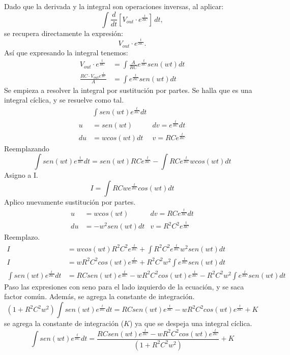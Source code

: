 \documentclass{article}
\begin{document}
Dado que la derivada y la integral son operaciones inversas, al aplicar:
\begin{equation*}
    \int \frac{d}{dt}\left[V_{out} \cdot e^{\frac{t}{RC}}\right]\,dt,
\end{equation*}
se recupera directamente la expresión:
\begin{equation*}
    V_{out} \cdot e^{\frac{t}{RC}}.
\end{equation*}
Así que expresando la integral tenemos:
\begin{align*}
    V_{out}\cdot e^{\frac{t}{RC}}&=\int \frac{A}{RC}e^{\frac{t}{RC}}sen(wt)dt \\
    \frac{RC\cdot V_{out}e^{\frac{t}{RC}}}{A}&=\int e^{\frac{t}{RC}}sen(wt)dt
\end{align*}
Se empieza a resolver la integral por sustitución por partes. Se halla que es una integral cíclica, y se resuelve como tal.
\begin{align*}
    &\int sen(wt)e^{\frac{t}{RC}}dt \\
    u&=sen(wt)
    &dv=e^{\frac{t}{RC}}dt\\
    du&=wcos(wt)dt
    &v=RCe^{\frac{t}{RC}}
\end{align*}
Reemplazando
\[
    \int sen(wt)e^{\frac{t}{RC}}dt=sen(wt)RCe^{\frac{t}{RC}}-\int RCe^{\frac{t}{RC}}wcos(wt)dt
\]
Asigno a I.
\[
    I=\int RCwe^{\frac{t}{RC}}cos(wt)dt
\]
Aplico nuevamente sustitución por partes.
\begin{align*}
    u&=wcos(wt)
    &dv=RCe^{\frac{t}{RC}}dt\\
    du&=-w^2sen(wt)dt
    &v=R^2C^2e^{\frac{t}{RC}}
\end{align*}
Reemplazo.
\begin{align*}
    I&=wcos(wt)R^2C^2e^{\frac{t}{RC}}+\int R^2C^2e^{\frac{t}{RC}}w^2sen(wt)dt \\
    I&=wR^2C^2cos(wt)e^{\frac{t}{RC}}+R^2C^2w^2\int e^{\frac{t}{RC}}sen(wt)dt \\
    \int sen(wt)e^{\frac{t}{RC}}dt&=RCsen(wt)e^{\frac{t}{RC}}-wR^2C^2cos(wt)e^{\frac{t}{RC}}-R^2C^2w^2\int e^{\frac{t}{RC}}sen(wt)dt
\end{align*}
Paso las expresiones con seno para el lado izquierdo de la ecuación, y se saca factor común. Además, se agrega la constante de integración.
\[
    (1+R^2C^2w^2)\int sen(wt)e^{\frac{t}{RC}}dt=RCsen(wt)e^{\frac{t}{RC}}-wR^2C^2cos(wt)e^{\frac{t}{RC}}+K
\]
se agrega la constante de integración (\(K\)) ya que se despeja una integral cíclica.
\[
    \int sen(wt)e^{\frac{t}{RC}}dt=\frac{RCsen(wt)e^{\frac{t}{RC}}-wR^2C^2cos(wt)e^{\frac{t}{RC}}}{(1+R^2C^2w^2)}+K
\]
\end{document}
